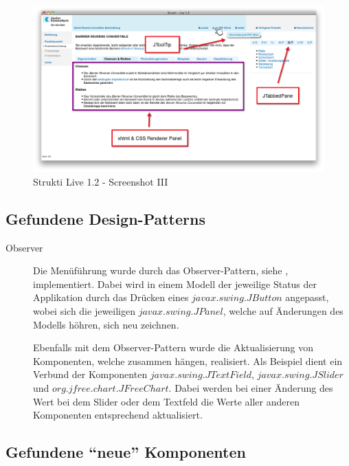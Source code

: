   \begin{figure}[htb]
    \begin{center}
      \includegraphics[width=\textwidth]{./image/SL/SL-03.png}
      \caption{Strukti Live 1.2 - Screenshot III}
      \label{img:SL-03}
    \end{center}
  \end{figure}
  
  \subsection{Gefundene Design-Patterns}
  
  \begin{description}
    \item[Observer]
    Die Menüführung wurde durch das Observer-Pattern, siehe
    \cite{ObserverDesignPattern}, implementiert. Dabei wird in einem Modell
    der jeweilige Status der Applikation durch das Drücken eines
    \(javax.swing.JButton\) angepasst, wobei sich die jeweiligen
    \(javax.swing.JPanel\), welche auf Änderungen des Modells höhren, sich neu
    zeichnen.

    Ebenfalls mit dem Observer-Pattern wurde die Aktualisierung von Komponenten,
    welche zusammen hängen, realisiert. Als Beispiel dient ein Verbund der
    Komponenten \(javax.swing.JTextField\), \(javax.swing.JSlider\) und
    \(org.jfree.chart.JFreeChart\). Dabei werden bei einer Änderung des Wert
    bei dem Slider oder dem Textfeld die Werte aller anderen Komponenten
    entsprechend aktualisiert.
  \end{description}
  
  \subsection{Gefundene ``neue'' Komponenten}
  
